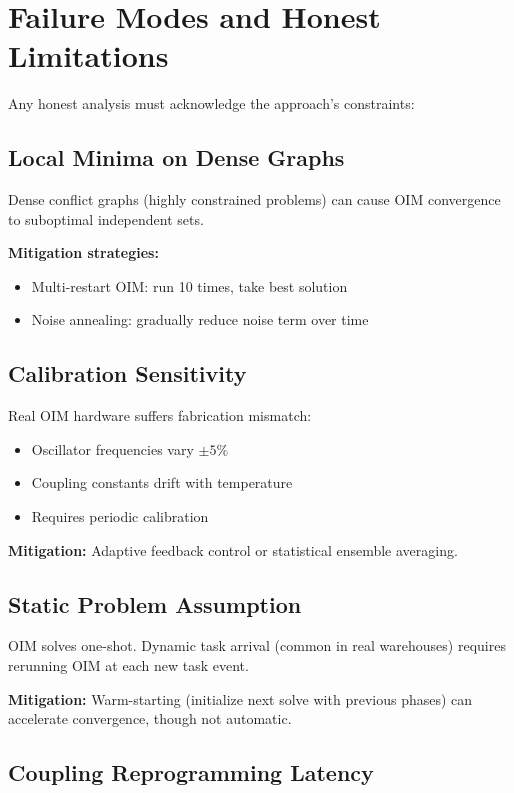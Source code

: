 \section{Failure Modes and Honest Limitations}
\label{sec:oim-limitations}

Any honest analysis must acknowledge the approach's constraints:

\subsection{Local Minima on Dense Graphs}

Dense conflict graphs (highly constrained problems) can cause OIM convergence to suboptimal independent sets.

\textbf{Mitigation strategies:}
\begin{itemize}
\item Multi-restart OIM: run 10 times, take best solution
\item Noise annealing: gradually reduce noise term over time
\end{itemize}

\subsection{Calibration Sensitivity}

Real OIM hardware suffers fabrication mismatch:
\begin{itemize}
\item Oscillator frequencies vary $\pm 5\%$
\item Coupling constants drift with temperature
\item Requires periodic calibration
\end{itemize}

\textbf{Mitigation:} Adaptive feedback control or statistical ensemble averaging.

\subsection{Static Problem Assumption}

OIM solves one-shot. Dynamic task arrival (common in real warehouses) requires rerunning OIM at each new task event.

\textbf{Mitigation:} Warm-starting (initialize next solve with previous phases) can accelerate convergence, though not automatic.

\subsection{Coupling Reprogramming Latency}

